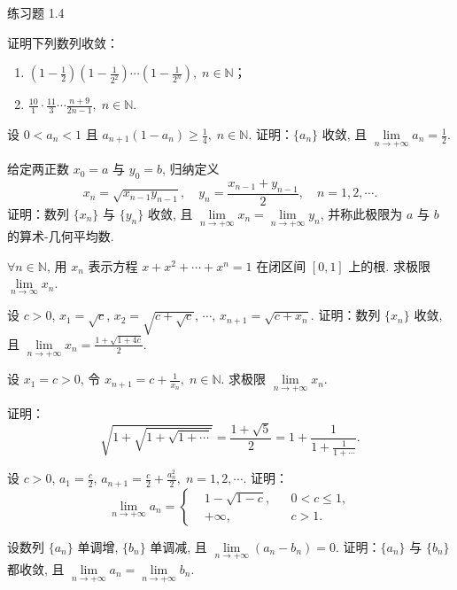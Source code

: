 \begin{exblock}{练习题 1.4}
\item 证明下列数列收敛：
\begin{enumerate}
\item $\left(1 - \frac{1}{2}\right)\left(1 - \frac{1}{2^2}\right)\cdots\left(1 - \frac{1}{2^n}\right),\; n\in\mathbb{N}$；
\item $\frac{10}{1} \cdot \frac{11}{3} \cdots \frac{n+9}{2n-1},\; n \in \mathbb{N}$.
\end{enumerate}

\item 设 $0 < a_{n} < 1$ 且 $a_{n+1}(1 - a_{n}) \geqslant \frac{1}{4},\; n \in \mathbb{N}$. 证明：$\{a_{n}\}$ 收敛, 且 $\lim\limits_{n \to +\infty} a_{n} = \frac{1}{2}$.

\item 给定两正数 $x_{0} = a$ 与 $y_{0} = b$, 归纳定义
\[
x_{n} = \sqrt{x_{n-1}y_{n-1}},\quad y_{n} = \frac{x_{n-1}+y_{n-1}}{2},\quad n=1, 2, \cdots.
\]
证明：数列 $\{x_{n}\}$ 与 $\{y_{n}\}$ 收敛, 且 $\lim\limits_{n\to+\infty}x_{n} = \lim\limits_{n\to+\infty}y_{n}$, 并称此极限为 $a$ 与 $b$ 的算术-几何平均数.

\item $\forall n \in \mathbb{N}$, 用 $x_n$ 表示方程 $x + x^2 + \cdots + x^n = 1$ 在闭区间 $[0,1]$ 上的根. 求极限 $\lim\limits_{n \to \infty} x_n$.

\item 设 $c > 0$, $x_{1} = \sqrt{c}$, $x_{2} = \sqrt{c + \sqrt{c}}$, $\cdots$, $x_{n+1} = \sqrt{c + x_{n}}$. 证明：数列 $\{x_{n}\}$ 收敛, 且 $\lim\limits_{n \to +\infty} x_{n} = \frac{1 + \sqrt{1 + 4c}}{2}$.

\item 设 $x_{1} = c > 0$, 令 $x_{n+1} = c + \frac{1}{x_{n}},\; n\in\mathbb{N}$. 求极限 $\lim\limits_{n\to+\infty}x_n$.

\item 证明：
\[
\sqrt{1+\sqrt{1+\sqrt{1+\cdots}}} = \frac{1+\sqrt{5}}{2} = 1 + \frac{1}{1 + \frac{1}{1 + \cdots}}.
\]

\item 设 $c>0$, $a_{1} = \frac{c}{2}$, $a_{n+1} = \frac{c}{2} + \frac{a_{n}^{2}}{2},\; n=1, 2, \cdots$. 证明：
\[
\lim_{n\to+\infty}a_{n} = \left\{\begin{aligned}
&1 - \sqrt{1-c},& &0 < c \leqslant 1, \\
&+\infty,& &c > 1.
\end{aligned}\right.
\]

\item 设数列 $\{a_{n}\}$ 单调增, $\{b_{n}\}$ 单调减, 且 $\lim\limits_{n\to+\infty}(a_{n}-b_{n}) = 0$. 证明：$\{a_{n}\}$ 与 $\{b_{n}\}$ 都收敛, 且 $\lim\limits_{n\to+\infty}a_{n} = \lim\limits_{n\to+\infty}b_{n}$.


\end{exblock}
